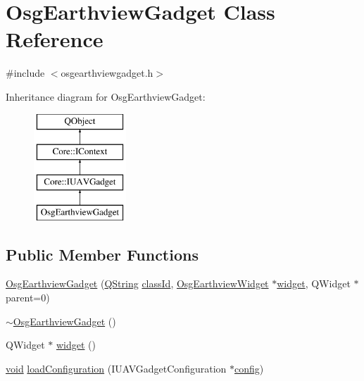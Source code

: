 \hypertarget{class_osg_earthview_gadget}{\section{Osg\-Earthview\-Gadget Class Reference}
\label{class_osg_earthview_gadget}
}


{\ttfamily \#include $<$osgearthviewgadget.\-h$>$}

Inheritance diagram for Osg\-Earthview\-Gadget\-:\begin{figure}[H]
\begin{center}
\leavevmode
\includegraphics[height=4.000000cm]{class_osg_earthview_gadget}
\end{center}
\end{figure}
\subsection*{Public Member Functions}
\begin{DoxyCompactItemize}
\item 
\hyperlink{class_osg_earthview_gadget_a640ab0335938bff4c3f40acc73cbea84}{Osg\-Earthview\-Gadget} (\hyperlink{group___u_a_v_objects_plugin_gab9d252f49c333c94a72f97ce3105a32d}{Q\-String} \hyperlink{group___core_plugin_ga3878fde66a57220608960bcc3fbeef2c}{class\-Id}, \hyperlink{class_osg_earthview_widget}{Osg\-Earthview\-Widget} $\ast$\hyperlink{class_osg_earthview_gadget_afe0558c328aaab48a03a82e29a57f879}{widget}, Q\-Widget $\ast$parent=0)
\item 
\hyperlink{class_osg_earthview_gadget_a6c3a0877d6a6f071d319411494f395ea}{$\sim$\-Osg\-Earthview\-Gadget} ()
\item 
Q\-Widget $\ast$ \hyperlink{class_osg_earthview_gadget_afe0558c328aaab48a03a82e29a57f879}{widget} ()
\item 
\hyperlink{group___u_a_v_objects_plugin_ga444cf2ff3f0ecbe028adce838d373f5c}{void} \hyperlink{class_osg_earthview_gadget_ac53e65d3181a74cec9e5784b27b6c117}{load\-Configuration} (I\-U\-A\-V\-Gadget\-Configuration $\ast$\hyperlink{deflate_8c_a4473b5227787415097004fd39f55185e}{config})
\end{DoxyCompactItemize}

